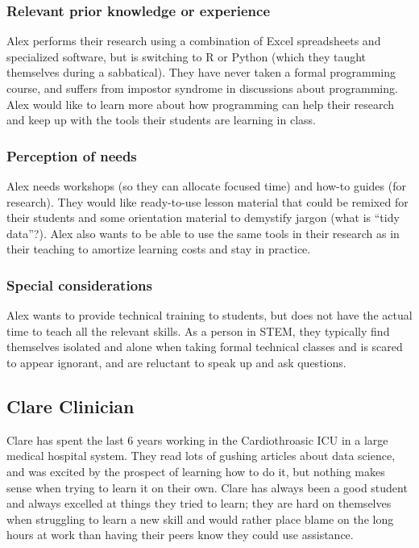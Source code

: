 \documentclass[../main.tex]{subfiles}
\begin{document}
            \subsubsection{Relevant prior knowledge or experience}

                Alex performs their research using a combination of
                Excel spreadsheets and specialized software,
                but is switching to R or Python (which they taught themselves during a sabbatical).
                They have never taken a formal programming course,
                and suffers from impostor syndrome in discussions about programming.
                Alex would like to learn more about how programming can help their research and
                keep up with the tools their students are learning in class.

            \subsubsection{Perception of needs}

                Alex needs workshops (so they can allocate focused time)
                and how-to guides (for research).
                They would like ready-to-use lesson material that could be remixed for their students and
                some orientation material to demystify jargon (what is “tidy data”?).
                Alex also wants to be able to use the same tools in their research
                as in their teaching to amortize learning costs and stay in practice.

            \subsubsection{Special considerations}

                Alex wants to provide technical training to students,
                but does not have the actual time to teach all the relevant skills.
                As a person in STEM,
                they typically find themselves isolated and alone when taking formal technical classes and
                is scared to appear ignorant, and are reluctant to speak up and ask questions.


        \subsection{Clare Clinician}

            Clare has spent the last 6 years working in the Cardiothroasic ICU in a large medical hospital system.
            They read lots of gushing articles about data science,
            and was excited by the prospect of learning how to do it,
            but nothing makes sense when trying to learn it on their own.
            Clare has always been a good student and always excelled at things they tried to learn;
            they are hard on themselves when struggling to learn a new skill and
            would rather place blame on the long hours at work than having their peers know they could use assistance.
\end{document}
